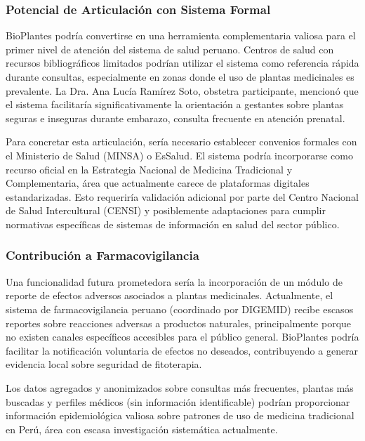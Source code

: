 \documentclass[12pt,a4paper]{article}
\begin{document}
\subsubsection{Potencial de Articulación con Sistema Formal}

BioPlantes podría convertirse en una herramienta complementaria valiosa para el primer nivel de atención del sistema de salud peruano. Centros de salud con recursos bibliográficos limitados podrían utilizar el sistema como referencia rápida durante consultas, especialmente en zonas donde el uso de plantas medicinales es prevalente. La Dra. Ana Lucía Ramírez Soto, obstetra participante, mencionó que el sistema facilitaría significativamente la orientación a gestantes sobre plantas seguras e inseguras durante embarazo, consulta frecuente en atención prenatal.

Para concretar esta articulación, sería necesario establecer convenios formales con el Ministerio de Salud (MINSA) o EsSalud. El sistema podría incorporarse como recurso oficial en la Estrategia Nacional de Medicina Tradicional y Complementaria, área que actualmente carece de plataformas digitales estandarizadas. Esto requeriría validación adicional por parte del Centro Nacional de Salud Intercultural (CENSI) y posiblemente adaptaciones para cumplir normativas específicas de sistemas de información en salud del sector público.

\subsubsection{Contribución a Farmacovigilancia}

Una funcionalidad futura prometedora sería la incorporación de un módulo de reporte de efectos adversos asociados a plantas medicinales. Actualmente, el sistema de farmacovigilancia peruano (coordinado por DIGEMID) recibe escasos reportes sobre reacciones adversas a productos naturales, principalmente porque no existen canales específicos accesibles para el público general. BioPlantes podría facilitar la notificación voluntaria de efectos no deseados, contribuyendo a generar evidencia local sobre seguridad de fitoterapia.

Los datos agregados y anonimizados sobre consultas más frecuentes, plantas más buscadas y perfiles médicos (sin información identificable) podrían proporcionar información epidemiológica valiosa sobre patrones de uso de medicina tradicional en Perú, área con escasa investigación sistemática actualmente.
\end{document}
